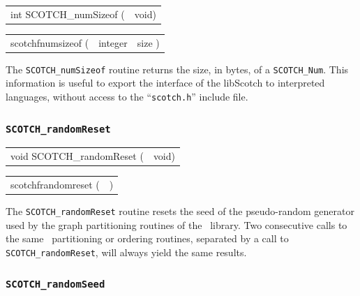 \begin{itemize}
\progsyn

{\tt\begin{tabular}{l@{}l}
int SCOTCH\_numSizeof ( & void)
\end{tabular}}

{\tt\begin{tabular}{l@{}ll}
scotchfnumsizeof ( & integer & size )
\end{tabular}}

\progdes

The {\tt SCOTCH\_numSizeof} routine returns the size, in bytes, of a
{\tt SCOTCH\_\lbt Num}. This information is useful to export the
interface of the {\sc libScotch} to interpreted languages, without
access to the ``{\tt scotch.h}'' include file.
\end{itemize}

\subsubsection{{\tt SCOTCH\_randomReset}}

\begin{itemize}
\progsyn

{\tt\begin{tabular}{l@{}l}
void SCOTCH\_randomReset ( & void)
\end{tabular}}

{\tt\begin{tabular}{l@{}l}
scotchfrandomreset ( & )
\end{tabular}}

\progdes

The {\tt SCOTCH\_randomReset} routine resets the seed of the
pseudo-random generator used by the graph partitioning routines
of the \libscotch\ library. Two consecutive calls to
the same \libscotch\ partitioning or ordering routines, separated
by a call to {\tt SCOTCH\_\lbt random\lbt Reset}, will always yield
the same results.
\end{itemize}

\subsubsection{{\tt SCOTCH\_randomSeed}}

